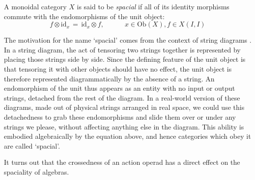 \documentclass{amsbook} %
\numberwithin{section}{chapter}
\begin{document}
\begin{Defi} A monoidal category $X$ is said to be \emph{spacial} if all of its identity morphisms commute with the endomorphisms of the unit object: 
\[ f \otimes \mathrm{id}_x \, = \, \mathrm{id}_x \otimes f, \quad \quad \quad x \in \mathrm{Ob}(X), f \in X(I,I) \]
\end{Defi}

The motivation for the name `spacial' comes from the context of string diagrams \cite{sel-graphmon}. In a string diagram, the act of tensoring two strings together is represented by placing those strings side by side. Since the defining feature of the unit object is that tensoring it with other objects should have no effect, the unit object is therefore represented diagrammatically by the absence of a string. An endomorphism of the unit thus appears as an entity with no input or output strings, detached from the rest of the diagram. In a real-world version of these diagrams, made out of physical strings arranged in real space, we could use this detachedness to grab these endomorphisms and slide them over or under any strings we please, without affecting anything else in the diagram. This ability is embodied algebraically by the equation above, and hence categories which obey it are called `spacial'.

It turns out that the crossedness of an action operad has a direct effect on the spaciality of algebras.
\end{document}
